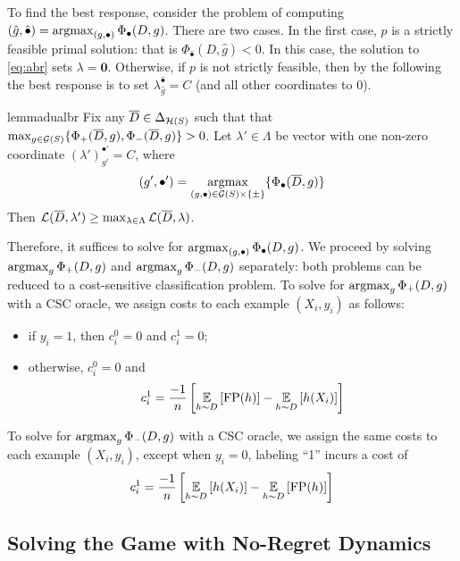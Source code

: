 To find the best response, consider the problem of computing
$(\hat g, \hat \bullet) = \operatorname*{\mathrm{argmax}}_{(g, \bullet)}\Phi_\bullet(D, g)$.
There are two cases. In the first case, $p$ is a strictly feasible primal
solution: that is $\Phi_{\hat \bullet} (D, \hat g) < 0$. In this case, the
solution to \eqref{eq:abr} sets $\lambda =
\mathbf{0}$. Otherwise, if $p$ is not strictly feasible, then by the following
 the best response is to set
$\lambda_{\hat g}^{\hat \bullet} = C$ (and all other coordinates to 0).


\begin{restatable}{lemma}{dualbr}\label{lem:dualbr}
  Fix any $\overline D\in \Delta_{\mathcal{H}(S)}$ such that that
  $\max_{g\in \mathcal{G}(S)} \{\Phi_+(\overline D, g), \Phi_-(\overline D,
  g)\} > 0$. Let $\lambda' \in \Lambda$ be vector with one non-zero
  coordinate $(\lambda')_{g'}^{\bullet'} = C$, where
  \[
    (g',\bullet') = \operatorname*{\mathrm{argmax}}_{(g, \bullet)\in \mathcal{G}(S)\times \{\pm\}}
    \{\Phi_\bullet(\overline D, g) \}
  \]
  Then
  $\mathcal{L}(\overline D, \lambda') \geq \max_{\lambda\in
    \Lambda}\mathcal{L}(\overline D, \lambda)$.
\end{restatable}







Therefore, it suffices to solve for
$\operatorname*{\mathrm{argmax}}_{(g, \bullet)}\Phi_\bullet(D, g)$. We proceed by solving
$\operatorname*{\mathrm{argmax}}_{g} \Phi_+(D, g)$ and $\operatorname*{\mathrm{argmax}}_{g} \Phi_-(D, g)$ separately:
 both problems can be reduced to a cost-sensitive classification
problem. To solve for $\operatorname*{\mathrm{argmax}}_{g} \Phi_+(D, g)$ with a CSC oracle, we
assign costs to each example $(X_i, y_i)$ as follows:
\begin{itemize}
\item if $y_i = 1$, then $c_i^0 = 0$ and $c_i^1 = 0$;
\item otherwise, $c_i^0 = 0$ and
  \begin{align}
    c_i^1 = \frac{-1}{n}\left[ \operatorname*{\mathbb{E}}_{h\sim D}\left[\mathrm{FP}(h)\right] - \operatorname*{\mathbb{E}}_{h\sim D}\left[h(X_i)\right]  \right]
  \end{align}
\end{itemize}

To solve for $\operatorname*{\mathrm{argmax}}_{g} \Phi_-(D, g)$ with a CSC oracle, we assign
the same costs to each example $(X_i, y_i)$, except when $y_i = 0$,
labeling ``1'' incurs a cost of
\[
  c_i^1 = \frac{-1}{n}\left[ \operatorname*{\mathbb{E}}_{h\sim D}\left[h(X_i)\right] - \operatorname*{\mathbb{E}}_{h\sim
      D}\left[\mathrm{FP}(h)\right] \right]
\]



\subsection{Solving the Game with No-Regret Dynamics}

